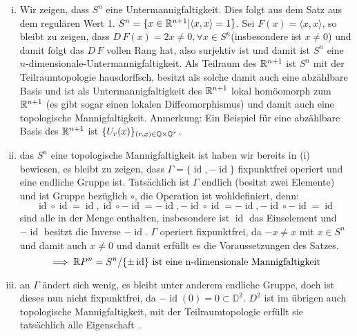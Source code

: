 \documentclass{scrartcl}
\newcommand{\id}{\operatorname{id}}
\begin{document}
\begin{aufgabe}
\begin{enumerate}[(i)]
\item Wir zeigen, dass $ S^n $ eine Untermannigfaltigkeit.  Dies folgt aus dem Satz aus dem regulären Wert 1. $ S^n= \{ x\in \mathbb{R}^{n+1}| \langle x , x \rangle=1 \} $. Sei $ F(x)=\langle x, x \rangle $, so bleibt zu zeigen, dass $ D\,F(x)=2x\neq 0, \forall x\in S^n $(insbesondere ist $ x\neq 0 $) und damit folgt das $ D\, F $ vollen Rang hat, also surjektiv ist und damit ist $ S^n $ eine $ n $-dimensionale-Untermannigfaltigkeit.  Als Teilraum des $ \mathbb{R}^{n+1} $ ist $ S^n $ mit der Teilraumtopologie hausdorffsch, besitzt als solche damit auch eine abzählbare Basis und ist als Untermannigfaltigkeit des $ \mathbb{R}^{n+1} $ lokal homöomorph zum $ \mathbb{R}^{n+1} $ (es gibt sogar einen lokalen Diffeomorphismus) und damit auch eine topologische Mannigfaltigkeit. 
Anmerkung: Ein Beispiel für eine abzählbare Basis des $ \mathbb{R}^{n+1} $ ist $ \{U_r(x)\}_{(r,x)\in\mathbb{Q}\times \mathbb{Q}^r} $.
\item das $ S^n $ eine topologische Mannigfaltigkeit ist haben wir bereits in (i) bewiesen, es bleibt zu zeigen, dass $ \Gamma=\{\id, -\id\} $ fixpunktfrei operiert und eine endliche Gruppe ist. Tatsächlich ist $ \Gamma $ endlich (besitzt zwei Elemente) und ist Gruppe bezüglich $ \circ $, die Operation ist wohldefiniert, denn:
\[
\id\circ \id=\id, \id \circ -\id=-\id, -\id \circ \id = - \id, -\id \circ -\id = \id 
\]
sind alle in der Menge enthalten, insbesondere ist $ \id $ das Einselement und $ -\id $ besitzt die Inverse $ -\id $. $ \Gamma $ operiert fixpunktfrei, da  $ -x\neq x $ mit $ x\in S^n $ und damit auch $ x\neq 0 $ und damit erfüllt es die Voraussetzungen des Satzes. 
\[
\implies \R P^n=S^n/\{\pm \id\} \text{ ist eine n-dimensionale Mannigfaltigkeit}
\]
\item an $ \Gamma $ ändert sich wenig, es bleibt unter anderem endliche Gruppe, doch ist dieses nun nicht fixpunktfrei, da $ -\id(0)=0\subset \mathbb D^2 $.  $ D^2 $ ist im übrigen auch topologische Mannigfaltigkeit, mit der Teilraumtopologie erfüllt sie tatsächlich alle Eigenschaft .



\end{enumerate}
\end{aufgabe}
\end{document}
